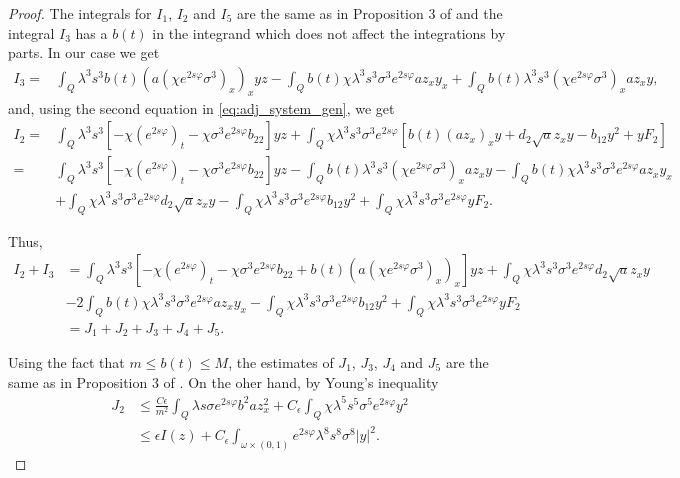 \documentclass[11pt,oneside,a4papper]{osajnl}
\begin{document}
\begin{proof}
The integrals for $I_1$, $I_2$ and $I_5$ are the same as in Proposition 3 of \cite{DemarqueLimacoViana_deg_sys2020} and the integral $I_3$ has a $b(t)$ in the integrand  which does not affect the integrations by parts. In our case we get
\begin{equation*}
\begin{split}
I_3 = &\int_Q \lambda^3 s^3 b(t)(a(\chi e^{2s\varphi} \sigma^3)_x)_x yz - \int_Q
b(t) \chi \lambda^3 s^3 \sigma^3 e^{2s\varphi} a z_x y_x + \int_Q b(t) \lambda^3 s^3 (\chi e^{2s\varphi} \sigma^3)_x a z_x y,
\end{split}    
\end{equation*}
and, using the second equation in \eqref{eq:adj_system_gen}, we get 
\begin{equation*}
\begin{split}
I_2= &\int_Q \lambda^3 s^3 \left[ -\chi (e^{2s\varphi})_t - \chi \sigma^3 e^{2s\varphi}b_{22} \right] yz  + \int_Q \chi \lambda^3 s^3 \sigma^3 e^{2s\varphi} \left[ b(t) (a z_x)_x y + d_2 \sqrt{a} z_x y - b_{12}y^2 + y F_2 \right] \\
= & \int_Q \lambda^3 s^3 \left[ -\chi (e^{2s\varphi})_t - \chi \sigma^3 e^{2s\varphi}b_{22} \right] yz - \int_Q b(t) \lambda^3 s^3 (\chi e^{2s\varphi} \sigma^3)_x a z_x y - \int_Q b(t) \chi \lambda^3 s^3 \sigma^3 e^{2s\varphi} a z_x y_x \\
&+ \int_Q \chi \lambda^3 s^3 \sigma^3 e^{2s\varphi} d_2 \sqrt{a} z_x y -\int_Q \chi \lambda^3 s^3 \sigma^3 e^{2s\varphi}b_{12}y^2 + \int_Q \chi \lambda^3 s^3 \sigma^3 e^{2s\varphi} y F_2.
\end{split}    
\end{equation*}

Thus,
\begin{equation}\label{eq:I2_I3}
\begin{split}
I_2 + I_3 &= \int_Q \lambda^3 s^3 \left[ -\chi (e^{2s\varphi})_t - \chi \sigma^3 e^{2s\varphi}b_{22}  + b(t)(a(\chi e^{2s\varphi} \sigma^3)_x)_x \right] yz + \int_Q \chi \lambda^3 s^3 \sigma^3 e^{2s\varphi} d_2 \sqrt{a} z_x y \\
&- 2 \int_Q b(t) \chi \lambda^3 s^3 \sigma^3 e^{2s\varphi} a z_x y_x -\int_Q \chi \lambda^3 s^3 \sigma^3 e^{2s\varphi}b_{12}y^2 + \int_Q \chi \lambda^3 s^3 \sigma^3 e^{2s\varphi} y F_2 \\
&= J_1 + J_2 + J_3 + J_4 + J_5.
\end{split}    
\end{equation}

Using the fact that $m \leq b(t) \leq M$, the estimates of $J_1$, $J_3$, $J_4$ and $J_5$ are the same as in Proposition 3 of \cite{DemarqueLimacoViana_deg_sys2020}. On the oher hand, by Young's inequality
\begin{equation*}
\begin{split}
J_2 &\leq \frac{C \epsilon}{m^2} \int_Q \lambda s \sigma e^{2s\varphi} b^2 a z_x^2 + C_\epsilon \int_Q \chi \lambda^5 s^5 \sigma^5 e^{2s\varphi} y^2 \\
&\leq \epsilon I(z) + C_\epsilon \int_{\omega \times (0,1)} e^{2s\varphi} \lambda^8 s^8 \sigma^8 |y|^2.    
\end{split}
\end{equation*}


\end{proof}
\end{document}

